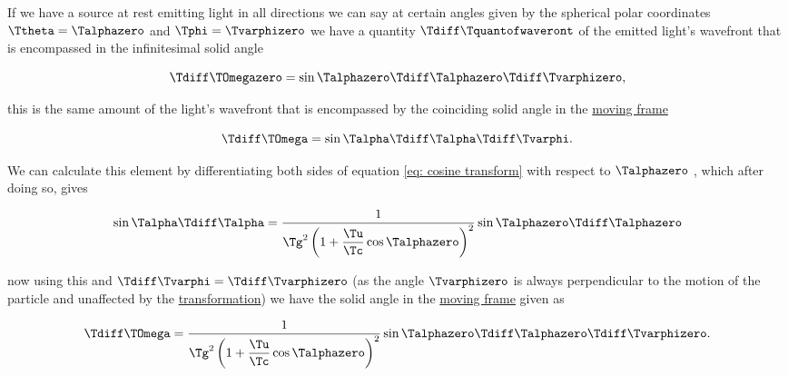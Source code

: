 \begin{derivation}

	If we have a source at rest emitting light in all directions we can say at certain angles given by the spherical polar coordinates $\Ttheta  = \Talphazero $ and $\Tphi = \Tvarphizero $ we have a quantity $\Tdiff \Tquantofwaveront $ of the emitted light's wavefront that is encompassed in the infinitesimal solid angle

	\begin{equation}
		\Tdiff \TOmegazero  = \sin{\Talphazero } \Tdiff \Talphazero  \Tdiff \Tvarphizero ,
	\end{equation}

	this is the same amount of the light's wavefront that is encompassed by the coinciding solid angle in the \hyperlink{def-Moving-Frame}{moving frame}

	\begin{equation}
		\Tdiff \TOmega  = \sin{\Talpha } \Tdiff \Talpha  \Tdiff \Tvarphi .
	\end{equation}

	We can calculate this element by differentiating both sides of equation
	\eqref{eq: cosine transform} with respect to $\Talphazero $ \cite{hogg1997special}, which after doing so, gives

	\begin{equation}
		\sin{\Talpha } \Tdiff \Talpha  = \dfrac{1}{ \Tg ^2 \left(1 + \dfrac{\Tu }{\Tc }\cos{\Talphazero }\right)^2} \sin{\Talphazero } \Tdiff \Talphazero
	\end{equation}

	now using this and ${\Tdiff \Tvarphi } = {\Tdiff \Tvarphizero }$ (as the angle ${\Tvarphizero }$ is always perpendicular to the motion of the particle and unaffected by the \hyperlink{def-transform}{transformation}) we have the solid angle in the \hyperlink{def-Moving-Frame}{moving frame} given as

	\begin{equation}
		\Tdiff \TOmega  = \dfrac{1}{ \Tg ^2 \left(1 + \dfrac{\Tu }{\Tc }\cos{\Talphazero }\right)^2} \sin{\Talphazero } \Tdiff \Talphazero  \Tdiff \Tvarphizero .
	\end{equation}



\end{derivation}
